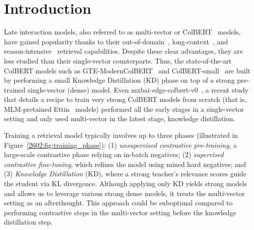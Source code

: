 \section{Introduction}

Late interaction models, also referred to as multi-vector or ColBERT~\cite{khattab2020colbert} models, have gained popularity thanks to their out-of-domain~\cite{santhanam2022colbertv2}, long-context~\cite{chaffin2025gte}, and reason-intensive~\cite{chaffin2025reason} retrieval capabilities. Despite these clear advantages, they are less studied than their single-vector counterparts. Thus, the state-of-the-art ColBERT models such as GTE-ModernColBERT~\cite{chaffin2025gte} and ColBERT-small~\cite{clavie2025colbert} are built by performing a small Knowledge Distillation (KD) phase on top of a strong pre-trained single-vector (dense) model. 
Even mxbai-edge-colbert-v0~\cite{takehi2025fantastic}, a recent study that details a recipe to train very strong ColBERT models from scratch (that is, MLM-pretained Ettin~\cite{weller2025seq} models) performed all the early stages in a single-vector setting and only used multi-vector in the latest stage, knowledge distillation.

Training a retrieval model typically involves up to three phases (illustrated in Figure~\ref{2602:fig:training_phase}): (1) \emph{unsupervised contrastive pre-training}, a large-scale contrastive phase relying on in-batch negatives; (2) \emph{supervised contrastive fine-tuning}, which refines the model using mined hard negatives; and (3) \emph{Knowledge Distillation} (KD), where a strong teacher's relevance scores guide the student via KL divergence. 
Although applying only KD yields strong models and allows us to leverage various strong dense models, it treats the multi-vector setting as an afterthought. This approach could be suboptimal compared to performing contrastive steps in the multi-vector setting before the knowledge distillation step. 

